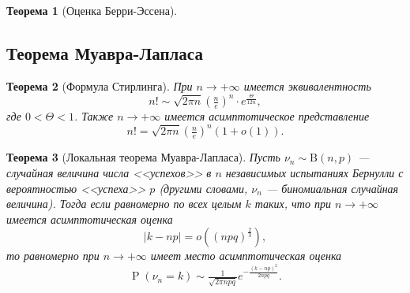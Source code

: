 \documentclass[12pt]{article}
\newtheorem{theorem}{Теорема}
\numberwithin{theorem}{section}
\theoremstyle{definition}
\newcommand{\prob}{\operatorname{P}}
\begin{document}
	
	
	\begin{theorem}[Оценка Берри-Эссена]
		
	\end{theorem}
	
	\subsection{Теорема Муавра-Лапласа}
	
	\begin{theorem}[Формула Стирлинга]
		При $ n \to +\infty $ имеется эквивалентность
		$$ n! \sim \sqrt{2\pi n} \left(\tfrac{n}{e}\right)^n \cdot e^{\tfrac{\Theta}{12n}}, $$
		где $ 0 < \Theta < 1 $.
		Также $ n \to +\infty $ имеется асимптотическое представление
		$$ n! = \sqrt{2\pi n} \left(\tfrac{n}{e}\right)^n(1 + o(1)). $$
	\end{theorem}
	
	\begin{theorem}[Локальная теорема Муавра-Лапласа]
		Пусть $ \nu_n \sim \mathrm{B}(n, p) $ --- случайная величина числа <<успехов>> в $ n $ независимых испытаниях Бернулли
		с вероятностью <<успеха>> $ p $ (другими словами, $ \nu_n $ --- биномиальная случайная величина).
		Тогда если равномерно по всех целым $ k $ таких, что при $ n \to +\infty $ имеется асимптотическая оценка
		$$ |k - np| = o\left((npq)^{\tfrac{2}{3}}\right), $$
		то равномерно при $ n \to +\infty $ имеет место асимптотическая оценка
		$$ \prob(\nu_n = k) \sim \tfrac{1}{\sqrt{2\pi npq}}e^{-\tfrac{(k - np)^2}{2npq}}. $$
	\end{theorem}
	
\end{document}
